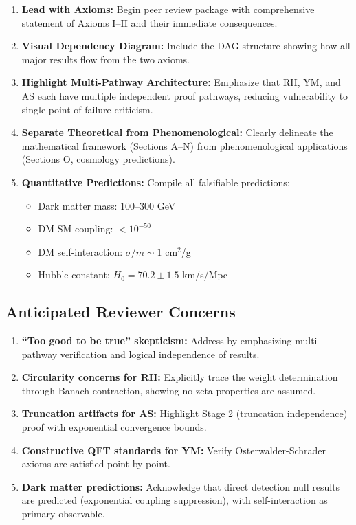 \documentclass[12pt, a4paper]{article}
\theoremstyle{definition}
\theoremstyle{remark}
\begin{document}
\begin{enumerate}
    \item \textbf{Lead with Axioms:} Begin peer review package with comprehensive statement of Axioms I--II and their immediate consequences.

    \item \textbf{Visual Dependency Diagram:} Include the DAG structure showing how all major results flow from the two axioms.

    \item \textbf{Highlight Multi-Pathway Architecture:} Emphasize that RH, YM, and AS each have multiple independent proof pathways, reducing vulnerability to single-point-of-failure criticism.

    \item \textbf{Separate Theoretical from Phenomenological:} Clearly delineate the mathematical framework (Sections A--N) from phenomenological applications (Sections O, cosmology predictions).

    \item \textbf{Quantitative Predictions:} Compile all falsifiable predictions:
    \begin{itemize}
        \item Dark matter mass: 100--300 GeV
        \item DM-SM coupling: $< 10^{-50}$
        \item DM self-interaction: $\sigma/m \sim 1$ cm$^2$/g
        \item Hubble constant: $H_0 = 70.2 \pm 1.5$ km/s/Mpc
    \end{itemize}
\end{enumerate}

\subsection{Anticipated Reviewer Concerns}

\begin{enumerate}
    \item \textbf{``Too good to be true'' skepticism:} Address by emphasizing multi-pathway verification and logical independence of results.

    \item \textbf{Circularity concerns for RH:} Explicitly trace the weight determination through Banach contraction, showing no zeta properties are assumed.

    \item \textbf{Truncation artifacts for AS:} Highlight Stage 2 (truncation independence) proof with exponential convergence bounds.

    \item \textbf{Constructive QFT standards for YM:} Verify Osterwalder-Schrader axioms are satisfied point-by-point.

    \item \textbf{Dark matter predictions:} Acknowledge that direct detection null results are predicted (exponential coupling suppression), with self-interaction as primary observable.
\end{enumerate}
\end{document}
